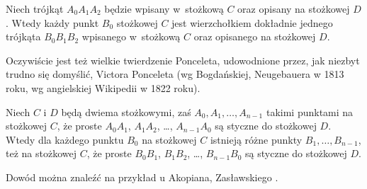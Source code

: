 \begin{theorem}
	Niech trójkąt $A_0 A_1 A_2$ będzie wpisany w~stożkową $C$ oraz opisany na stożkowej $D$.
	Wtedy każdy punkt $B_0$ stożkowej $C$ jest wierzchołkiem dokładnie jednego trójkąta $B_0 B_1 B_2$ wpisanego w~stożkową $C$ oraz opisanego na stożkowej $D$.
\end{theorem}

Oczywiście jest też wielkie twierdzenie Ponceleta, udowodnione przez, jak niezbyt trudno się domyślić, Victora Ponceleta \cite[s. 311-317]{poncelet_1865} (wg Bogdańskiej, Neugebauera w 1813 roku, wg angielskiej Wikipedii w 1822 roku).
%

\begin{theorem}
\label{big_poncelet}%
	Niech $C$ i $D$ będą dwiema stożkowymi, zaś $A_0, A_1, \ldots, A_{n-1}$ takimi punktami na stożkowej $C$, że proste $A_0A_1$, $A_1A_2$, \ldots, $A_{n-1}A_0$ są styczne do stożkowej $D$.
	Wtedy dla każdego punktu $B_0$ na stożkowej $C$ istnieją różne punkty $B_1, \ldots, B_{n-1}$, też na stożkowej $C$, że proste $B_0B_1$, $B_1B_2$, \ldots, $B_{n-1}B_0$ są styczne do stożkowej $D$.
\end{theorem}

Dowód można znaleźć na przykład u Akopiana, Zasławskiego \cite[s. 93, 61, 67, 115, 124]{akopyan_2007}.